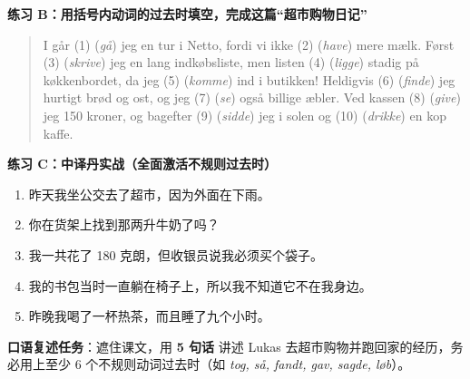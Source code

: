 \vspace{0.3em}

\textbf{练习 B：用括号内动词的过去时填空，完成这篇“超市购物日记”}
\begin{quote}
I går (1) \underline{\hspace{1.8cm}} (\textit{gå}) jeg en tur i Netto, fordi vi ikke (2) \underline{\hspace{1.8cm}} (\textit{have}) mere mælk. Først (3) \underline{\hspace{1.8cm}} (\textit{skrive}) jeg en lang indkøbsliste, men listen (4) \underline{\hspace{1.8cm}} (\textit{ligge}) stadig på køkkenbordet, da jeg (5) \underline{\hspace{1.8cm}} (\textit{komme}) ind i butikken! Heldigvis (6) \underline{\hspace{1.8cm}} (\textit{finde}) jeg hurtigt brød og ost, og jeg (7) \underline{\hspace{1.8cm}} (\textit{se}) også billige æbler. Ved kassen (8) \underline{\hspace{1.8cm}} (\textit{give}) jeg 150 kroner, og bagefter (9) \underline{\hspace{1.8cm}} (\textit{sidde}) jeg i solen og (10) \underline{\hspace{1.8cm}} (\textit{drikke}) en kop kaffe.
\end{quote}

\textbf{练习 C：中译丹实战（全面激活不规则过去时）}
\begin{enumerate}
  \item 昨天我坐公交去了超市，因为外面在下雨。
  \item 你在货架上找到那两升牛奶了吗？
  \item 我一共花了 180 克朗，但收银员说我必须买个袋子。
  \item 我的书包当时一直躺在椅子上，所以我不知道它不在我身边。
  \item 昨晚我喝了一杯热茶，而且睡了九个小时。
\end{enumerate}


\textbf{口语复述任务}：遮住课文，用 \textbf{5 句话} 讲述 Lukas 去超市购物并跑回家的经历，务必用上至少 6 个不规则动词过去时（如 \textit{tog, så, fandt, gav, sagde, løb}）。

